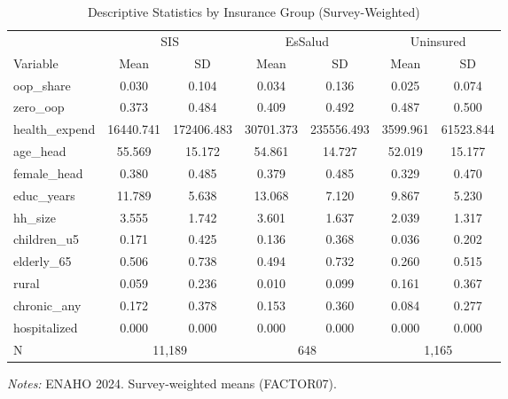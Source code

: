 \begin{table}[htbp]
\centering
\caption{Descriptive Statistics by Insurance Group (Survey-Weighted)}
\label{tab:balance}
\small
\begin{tabular}{lcccccc}
\toprule
& \multicolumn{2}{c}{SIS} & \multicolumn{2}{c}{EsSalud} & \multicolumn{2}{c}{Uninsured} \\
\cmidrule(lr){2-3} \cmidrule(lr){4-5} \cmidrule(lr){6-7}
Variable & Mean & SD & Mean & SD & Mean & SD \\
\midrule
  oop\_share & 0.030 & 0.104 & 0.034 & 0.136 & 0.025 & 0.074 \\
  zero\_oop & 0.373 & 0.484 & 0.409 & 0.492 & 0.487 & 0.500 \\
  health\_expend & 16440.741 & 172406.483 & 30701.373 & 235556.493 & 3599.961 & 61523.844 \\
  age\_head & 55.569 & 15.172 & 54.861 & 14.727 & 52.019 & 15.177 \\
  female\_head & 0.380 & 0.485 & 0.379 & 0.485 & 0.329 & 0.470 \\
  educ\_years & 11.789 & 5.638 & 13.068 & 7.120 & 9.867 & 5.230 \\
  hh\_size & 3.555 & 1.742 & 3.601 & 1.637 & 2.039 & 1.317 \\
  children\_u5 & 0.171 & 0.425 & 0.136 & 0.368 & 0.036 & 0.202 \\
  elderly\_65 & 0.506 & 0.738 & 0.494 & 0.732 & 0.260 & 0.515 \\
  rural & 0.059 & 0.236 & 0.010 & 0.099 & 0.161 & 0.367 \\
  chronic\_any & 0.172 & 0.378 & 0.153 & 0.360 & 0.084 & 0.277 \\
  hospitalized & 0.000 & 0.000 & 0.000 & 0.000 & 0.000 & 0.000 \\
\midrule
  N & \multicolumn{2}{c}{11,189} & \multicolumn{2}{c}{648} & \multicolumn{2}{c}{1,165} \\
\bottomrule
\end{tabular}
\begin{minipage}{\textwidth}\footnotesize
\textit{Notes:} ENAHO 2024. Survey-weighted means (FACTOR07).
\end{minipage}
\end{table}